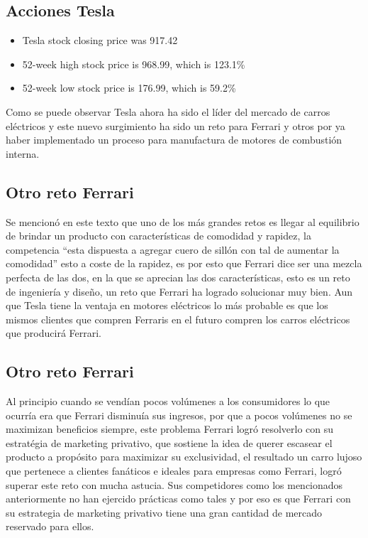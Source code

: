 \documentclass{article}
\begin{document}
\subsection*{Acciones Tesla}
\begin{itemize}
    \item Tesla stock closing price was 917.42
    \item 52-week high stock price is 968.99, which is 123.1\% 
    \item 52-week low stock price is 176.99, which is 59.2\%
\end{itemize}

Como se puede observar Tesla ahora ha sido el líder del mercado de carros eléctricos y este nuevo surgimiento ha sido un reto para Ferrari y otros por ya haber implementado un proceso para manufactura de motores de combustión interna.

\subsection*{Otro reto Ferrari}
Se mencionó en este texto que uno de los más grandes retos es llegar al equilibrio de brindar un producto con características de comodidad y rapidez, la competencia ``esta dispuesta a agregar cuero de sillón con tal de aumentar la comodidad'' esto a coste de la rapidez, es por esto que Ferrari dice ser una mezcla perfecta de las dos, en la que se aprecian las dos características, esto es un reto de ingeniería y diseño, un reto que Ferrari ha logrado solucionar muy bien. Aun que Tesla tiene la ventaja en motores eléctricos lo más probable es que los mismos clientes que compren Ferraris en el futuro compren los carros eléctricos que producirá Ferrari.


\subsection*{Otro reto Ferrari}
Al principio cuando se vendían pocos volúmenes a los consumidores lo que ocurría era que Ferrari disminuía sus ingresos, por que a pocos volúmenes no se maximizan beneficios siempre, este problema Ferrari logró resolverlo con su estratégia de marketing privativo, que sostiene la idea de querer escasear el producto a propósito para maximizar su exclusividad, el resultado un carro lujoso que pertenece a clientes fanáticos e ideales para empresas como Ferrari, logró superar este reto con mucha astucia. Sus competidores como los mencionados anteriormente no han ejercido prácticas como tales y por eso es que Ferrari con su estrategia de marketing privativo tiene una gran cantidad de mercado reservado para ellos.
\end{document}
